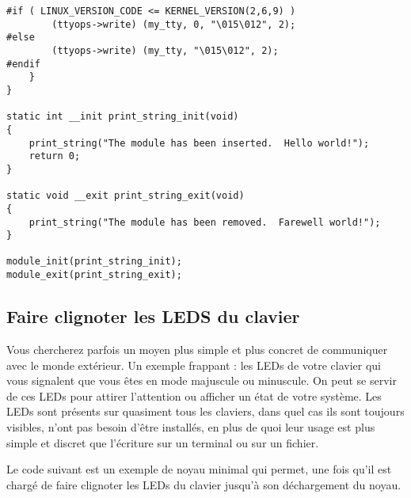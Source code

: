 \documentclass[11pt]{article}
\begin{document}
\begin{verbatim}
#if ( LINUX_VERSION_CODE <= KERNEL_VERSION(2,6,9) )
        (ttyops->write) (my_tty, 0, "\015\012", 2);
#else
        (ttyops->write) (my_tty, "\015\012", 2);
#endif
    }
}

static int __init print_string_init(void)
{
    print_string("The module has been inserted.  Hello world!");
    return 0;
}

static void __exit print_string_exit(void)
{
    print_string("The module has been removed.  Farewell world!");
}

module_init(print_string_init);
module_exit(print_string_exit);
\end{verbatim}

\subsection*{Faire clignoter les LEDS du clavier}
\label{sec-13-2}

Vous chercherez parfois un moyen plus simple et plus concret de communiquer avec le monde extérieur. Un exemple frappant : les LEDs de votre clavier qui vous signalent que vous êtes en mode majuscule ou minuscule. On peut se servir de ces LEDs pour attirer l'attention ou afficher un état de votre système. Les LEDs sont présents sur quasiment tous les claviers, dans quel cas ils sont toujours visibles, n'ont pas besoin d'être installés, en plus de quoi leur usage est plus simple et discret que l'écriture sur un terminal ou sur un fichier.

Le code suivant est un exemple de noyau minimal qui permet, une fois qu'il est chargé de faire clignoter les LEDs du clavier jusqu'à son déchargement du noyau.
\end{document}
